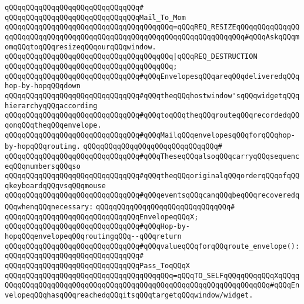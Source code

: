 \verb|qQQqqQQqqQQqqQQqqQQqqQQqqQQqqQQq#|\newline
\verb|qQQqqQQqqQQqqQQqqQQqqQQqqQQqqQQqMail_To_Mom|\newline
\verb|qQQqqQQqqQQqqQQqqQQqqQQqqQQqqQQqqQQqqQQq=qQQqREQ_RESIZEqQQqqQQqqQQqqQQqqQQqqQQqqQQqqQQqqQQqqQQqqQQqqQQqqQQqqQQqqQQqqQQqqQQqqQQq#qQQqAskqQQqmomqQQqtoqQQqresizeqQQqourqQQqwindow.|\newline
\verb|qQQqqQQqqQQqqQQqqQQqqQQqqQQqqQQqqQQqqQQq|\verb#|qQQqREQ_DESTRUCTION#\newline
\verb|qQQqqQQqqQQqqQQqqQQqqQQqqQQqqQQqqQQqqQQq;|\newline
\newline
\newline
\verb|qQQqqQQqqQQqqQQqqQQqqQQqqQQqqQQq#qQQqEnvelopesqQQqareqQQqdeliveredqQQqhop-by-hopqQQqdown|\newline
\verb|qQQqqQQqqQQqqQQqqQQqqQQqqQQqqQQq#qQQqtheqQQqhostwindow'sqQQqwidgetqQQqhierarchyqQQqaccording|\newline
\verb|qQQqqQQqqQQqqQQqqQQqqQQqqQQqqQQq#qQQqtoqQQqtheqQQqrouteqQQqrecordedqQQqonqQQqtheqQQqenvelope.|\newline
\newline
\verb|qQQqqQQqqQQqqQQqqQQqqQQqqQQqqQQq#qQQqMailqQQqenvelopesqQQqforqQQqhop-by-hopqQQqrouting.|\newline
\verb|qQQqqQQqqQQqqQQqqQQqqQQqqQQqqQQq#|\newline
\verb|qQQqqQQqqQQqqQQqqQQqqQQqqQQqqQQq#qQQqTheseqQQqalsoqQQqcarryqQQqsequenceqQQqnumbersqQQqso|\newline
\verb|qQQqqQQqqQQqqQQqqQQqqQQqqQQqqQQq#qQQqtheqQQqoriginalqQQqorderqQQqofqQQqkeyboardqQQqvsqQQqmouse|\newline
\verb|qQQqqQQqqQQqqQQqqQQqqQQqqQQqqQQq#qQQqeventsqQQqcanqQQqbeqQQqrecoveredqQQqwhenqQQqnecessary:|\newline
\verb|qQQqqQQqqQQqqQQqqQQqqQQqqQQqqQQq#|\newline
\verb|qQQqqQQqqQQqqQQqqQQqqQQqqQQqqQQqEnvelopeqQQqX;|\newline
\newline
\verb|qQQqqQQqqQQqqQQqqQQqqQQqqQQqqQQq#qQQqHop-by-hopqQQqenvelopeqQQqroutingqQQq--qQQqreturn|\newline
\verb|qQQqqQQqqQQqqQQqqQQqqQQqqQQqqQQq#qQQqvalueqQQqforqQQqroute_envelope():|\newline
\verb|qQQqqQQqqQQqqQQqqQQqqQQqqQQqqQQq#|\newline
\verb|qQQqqQQqqQQqqQQqqQQqqQQqqQQqqQQqPass_ToqQQqX|\newline
\verb|qQQqqQQqqQQqqQQqqQQqqQQqqQQqqQQqqQQqqQQq=qQQqTO_SELFqQQqqQQqqQQqXqQQqqQQqqQQqqQQqqQQqqQQqqQQqqQQqqQQqqQQqqQQqqQQqqQQqqQQqqQQqqQQqqQQq#qQQqEnvelopeqQQqhasqQQqreachedqQQqitsqQQqtargetqQQqwindow/widget.|\newline
